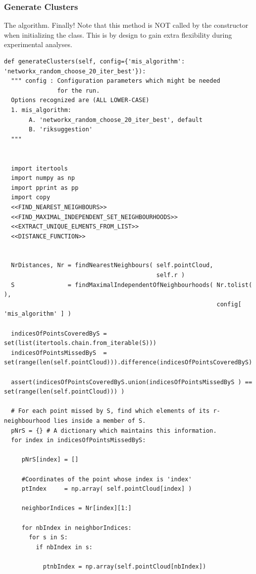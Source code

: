 \documentclass[11pt]{article}
\begin{document}
\subsubsection{Generate Clusters}
\label{sec-3-2-2}

The algorithm. Finally! Note that this method is NOT called by the constructor when initializing 
the class. This is by design to gain extra flexibility during experimental analyses. 


\begin{verbatim}
def generateClusters(self, config={'mis_algorithm': 'networkx_random_choose_20_iter_best'}):
  """ config : Configuration parameters which might be needed 
               for the run. 
  Options recognized are (ALL LOWER-CASE)
  1. mis_algorithm:
       A. 'networkx_random_choose_20_iter_best', default 
       B. 'riksuggestion'
  """


  import itertools
  import numpy as np
  import pprint as pp
  import copy
  <<FIND_NEAREST_NEIGHBOURS>>
  <<FIND_MAXIMAL_INDEPENDENT_SET_NEIGHBOURHOODS>>
  <<EXTRACT_UNIQUE_ELMENTS_FROM_LIST>>
  <<DISTANCE_FUNCTION>>


  NrDistances, Nr = findNearestNeighbours( self.pointCloud, 
                                           self.r )
  S               = findMaximalIndependentOfNeighbourhoods( Nr.tolist( ), 
                                                            config[ 'mis_algorithm' ] )

  indicesOfPointsCoveredByS = set(list(itertools.chain.from_iterable(S)))
  indicesOfPointsMissedByS  = set(range(len(self.pointCloud))).difference(indicesOfPointsCoveredByS)

  assert(indicesOfPointsCoveredByS.union(indicesOfPointsMissedByS ) == set(range(len(self.pointCloud))) )

  # For each point missed by S, find which elements of its r-neighbourhood lies inside a member of S. 
  pNrS = {} # A dictionary which maintains this information.  
  for index in indicesOfPointsMissedByS:

     pNrS[index] = [] 

     #Coordinates of the point whose index is 'index'
     ptIndex     = np.array( self.pointCloud[index] )

     neighborIndices = Nr[index][1:] 

     for nbIndex in neighborIndices:
       for s in S:
         if nbIndex in s:

           ptnbIndex = np.array(self.pointCloud[nbIndex])


\end{verbatim}
\end{document}
